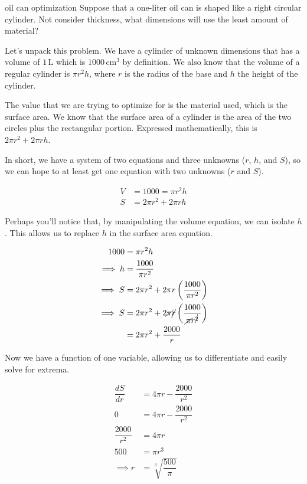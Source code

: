 \begin{examplebreak}{oil can optimization}
    Suppose that a one-liter oil can is shaped like a right circular cylinder. Not consider thickness, what dimensions will use the least amount of material?
    
    \vspace{0.3cm}
    
    Let's unpack this problem. We have a cylinder of unknown dimensions that has a volume of \( 1 \, \si{\liter} \) which is \( 1000 \, \si{\cm^3} \) by definition. We also know that the volume of a regular cylinder is \( \pi r^2 h \), where \( r \) is the radius of the base and \( h \) the height of the cylinder.
    
    The value that we are trying to optimize for is the material used, which is the surface area. We know that the surface area of a cylinder is the area of the two circles plus the rectangular portion. Expressed mathematically, this is \( 2 \pi r^2 + 2 \pi r h \).
    
    In short, we have a system of two equations and three unknowns (\( r \), \( h \), and \( S \)), so we can hope to at least get one equation with two unknowns (\( r \) and \( S \)).
    
    \begin{align}
        V &= 1000 = \pi r^2 h \\
        S &= 2 \pi r^2 + 2 \pi r h
    \end{align}
    
    Perhaps you'll notice that, by manipulating the volume equation, we can isolate \( h \). This allows us to replace \( h \) in the surface area equation.
    
    \begin{align}
        1000 &= \pi r^2 h \\
        \implies h &= \dfrac{1000}{\pi r^2} \\
        \implies S &= 2 \pi r^2 + 2 \pi r \left( \dfrac{1000}{\pi r^2} \right) \\
        \implies S &= 2 \pi r^2 + 2 \cancel{\pi} \cancel{r} \left( \dfrac{1000}{\cancel{\pi} r^{\cancel{2}}} \right) \\
        &= 2 \pi r^2 + \dfrac{2000}{r}
    \end{align}
    
    Now we have a function of one variable, allowing us to differentiate and easily solve for extrema.
    
    \begin{align}
        \dfrac{dS}{dr} &= 4 \pi r - \dfrac{2000}{r^2} \\
        0 &= 4 \pi r - \dfrac{2000}{r^2} \\
        \dfrac{2000}{r^2} &= 4 \pi r \\
        500 &= \pi r^3 \\
        \implies r &= \sqrt[3]{\dfrac{500}{\pi}}
    \end{align}
    

\end{examplebreak}
